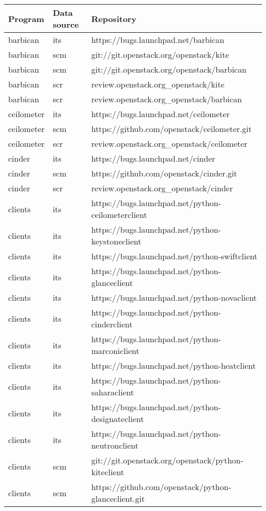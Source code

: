 \begin{center}
\begin{longtable}{|p{4cm}|p{1cm}|p{10cm}|}
\hline
Program & Data source & Repository \\
\hline

barbican&its&https://bugs.launchpad.net/barbican\\ 
barbican&scm&git://git.openstack.org/openstack/kite\\ 
barbican&scm&git://git.openstack.org/openstack/barbican\\ 
barbican&scr&review.openstack.org\_openstack/kite\\ 
barbican&scr&review.openstack.org\_openstack/barbican\\ 
ceilometer&its&https://bugs.launchpad.net/ceilometer\\ 
ceilometer&scm&https://github.com/openstack/ceilometer.git\\ 
ceilometer&scr&review.openstack.org\_openstack/ceilometer\\ 
cinder&its&https://bugs.launchpad.net/cinder \\ 
cinder&scm&https://github.com/openstack/cinder.git\\ 
cinder&scr&review.openstack.org\_openstack/cinder\\ 
clients&its&https://bugs.launchpad.net/python-ceilometerclient\\ 
clients&its&https://bugs.launchpad.net/python-keystoneclient\\ 
clients&its&https://bugs.launchpad.net/python-swiftclient\\ 
clients&its&https://bugs.launchpad.net/python-glanceclient\\ 
clients&its&https://bugs.launchpad.net/python-novaclient\\ 
clients&its&https://bugs.launchpad.net/python-cinderclient\\ 
clients&its&https://bugs.launchpad.net/python-marconiclient\\ 
clients&its&https://bugs.launchpad.net/python-heatclient\\ 
clients&its&https://bugs.launchpad.net/python-saharaclient\\ 
clients&its&https://bugs.launchpad.net/python-designateclient\\ 
clients&its&https://bugs.launchpad.net/python-neutronclient\\ 
clients&scm&git://git.openstack.org/openstack/python-kiteclient\\ 
clients&scm&https://github.com/openstack/python-glanceclient.git\\ 

\end{longtable}
\end{center}
